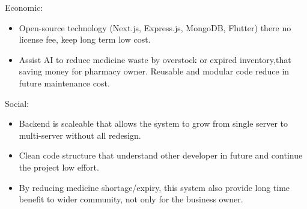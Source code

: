 Economic:
\begin{itemize}
\item Open-source technology (Next.js, Express.js, MongoDB, Flutter) there no license fee, keep long term low cost.
\item Assist AI to reduce medicine waste by overstock or expired inventory,that saving money for pharmacy owner.
Reusable and modular code reduce in future maintenance cost.
\end{itemize}

Social:
\begin{itemize}
\item Backend is scaleable that allows the system to grow from single server to multi-server without all redesign.
\item Clean code structure that understand other developer in future and continue the project low effort.
\item By reducing medicine shortage/expiry, this system also provide long time benefit to wider community, not only for the business owner.
\end{itemize}

